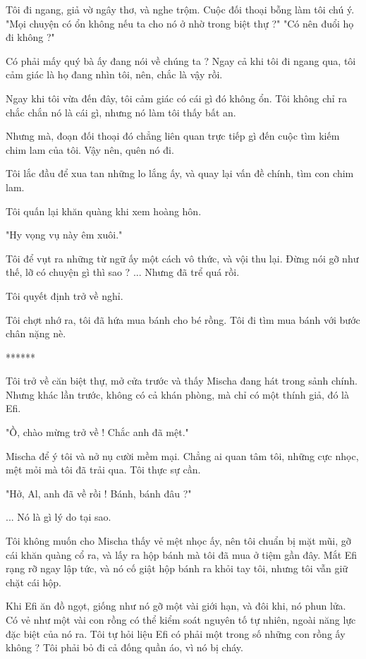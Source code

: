  Tôi đi ngang, giả vờ ngây thơ, và nghe trộm. Cuộc đối thoại bỗng làm tôi chú ý. "Mọi chuyện có ổn không nếu ta cho nó ở nhờ trong biệt thự ?" "Có nên đuổi họ đi không ?"
 
 Có phải mấy quý bà ấy đang nói về chúng ta ? Ngay cả khi tôi đi ngang qua, tôi cảm giác là họ đang nhìn tôi, nên, chắc là vậy rồi.
 
 Ngay khi tôi vừa đến đây, tôi cảm giác có cái gì đó không ổn. Tôi không chỉ ra chắc chắn nó là cái gì, nhưng nó làm tôi thấy bất an.
 
 Nhưng mà, đoạn đối thoại đó chẳng liên quan trực tiếp gì đến cuộc tìm kiếm chim lam của tôi. Vậy nên, quên nó đi.
 
 Tôi lắc đầu để xua tan những lo lắng ấy, và quay lại vấn đề chính, tìm con chim lam.
 
 Tôi quấn lại khăn quàng khi xem hoàng hôn.
 
 "Hy vọng vụ này êm xuôi."
 
 Tôi để vụt ra những từ ngữ ấy một cách vô thức, và vội thu lại. Đừng nói gỡ như thế, lỡ có chuyện gì thì sao ? ... Nhưng đã trể quá rồi.
 
 Tôi quyết định trở về nghỉ.
 
 Tôi chợt nhớ ra, tôi đã hứa mua bánh cho bé rồng. Tôi đi tìm mua bánh với bước chân nặng nè.\\
 
  \begin{center}
 	******
 \end{center}
 
 Tôi trở về căn biệt thự, mở cửa trước và thấy Mischa đang hát trong sảnh chính. Nhưng khác lần trước, không có cả khán phòng, mà chỉ có một thính giả, đó là Efi.
 
 "Ồ, chào mừng trở về ! Chắc anh đã mệt."
 
 Mischa để ý tôi và nở nụ cười mềm mại. Chẳng ai quan tâm tôi, những cực nhọc, mệt mỏi mà tôi đã trải qua. Tôi thực sự cần.
 
 "Hở, Al, anh đã về rồi ! Bánh, bánh đâu ?"
 
 ... Nó là gì lý do tại sao.
 
 Tôi không muốn cho Mischa thấy vẻ mệt nhọc ấy, nên tôi chuẩn bị mặt mũi, gỡ cái khăn quàng cổ ra, và lấy ra hộp bánh mà tôi đã mua ở tiệm gần đây. Mắt Efi rạng rỡ ngay lập tức, và nó cố giật hộp bánh ra khỏi tay tôi, nhưng tôi vẫn giữ chặt cái hộp.
 
 Khi Efi ăn đồ ngọt, giống như nó gỡ một vài giới hạn, và đôi khi, nó phun lửa. Có vẻ như một vài con rồng có thể kiểm soát nguyên tố tự nhiên, ngoài năng lực đặc biệt
 của nó ra. Tôi tự hỏi liệu Efi có phải một trong số những con rồng ấy không ? Tôi phải bỏ đi cả đống quần áo, vì nó bị cháy. 
 
